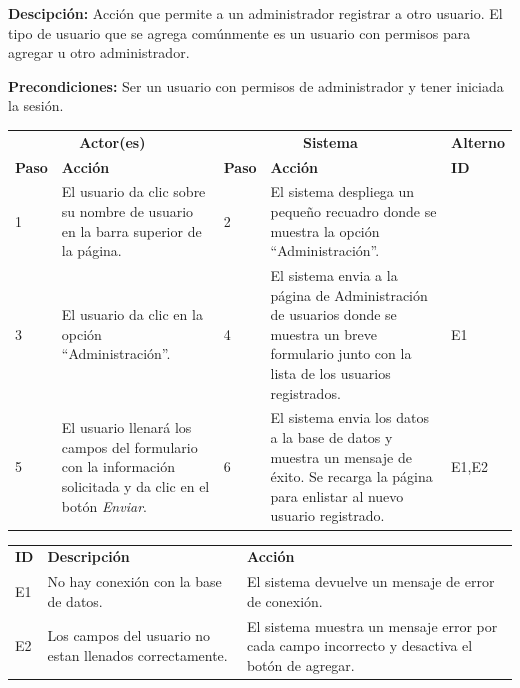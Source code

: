 \documentclass[10pt,letterpaper]{article}
\begin{document}
\textbf{Descipción: } Acción que permite a un administrador registrar a otro usuario. El tipo de usuario que se agrega comúnmente es un usuario con permisos para agregar u otro administrador.

\textbf{Precondiciones:} Ser un usuario con permisos de administrador y tener iniciada la sesión.

\begin{adjustwidth}{-6em}{-6em}
	\begin{center}
		\begin{tabularx}{1.2\textwidth}{ | p{0.7cm} | X | p{0.7cm} | X | p{1.5cm} | }
			\hline
			\rowcolor{NewBlue} \multicolumn{5}{|c|}{\textbf{Flujo normal de eventos}} \\
			\hline
			\multicolumn{2}{|c|}{\textbf{Actor(es)}}	&	\multicolumn{2}{c|}{\textbf{Sistema}}	&	\textbf{Alterno} \\
			\hline
			\textbf{Paso}	&	\textbf{Acción}	&	\textbf{Paso}	&	\textbf{Acción}	&	\textbf{ID} \\
			\hline
			1 & 
			El usuario da clic sobre su nombre de usuario en la barra superior de la página.&
			2 &
			El sistema despliega un pequeño recuadro donde se muestra la opción ``Administración''. &
			
			\\
			\hline
			3 & 
			El usuario da clic en la opción ``Administración''.&
			4 &
			El sistema envia a la página de Administración de usuarios donde se muestra un breve formulario junto con la lista de los usuarios registrados.&
			E1
			\\
			\hline
			5 & 
			El usuario llenará los campos del formulario con la información solicitada y da clic en el botón \textit{Enviar}.&
			6 &
			El sistema envia los datos a la base de datos y muestra un mensaje de éxito. Se recarga la página para enlistar al nuevo usuario registrado.&
			E1,E2
			\\
			\hline
		\end{tabularx}
	\end{center}
\end{adjustwidth}

\begin{adjustwidth}{-6em}{-6em}
	\begin{center}
		\begin{tabularx}{1.2\textwidth}{ | p{0.6cm} | X | X | }
			\hline
			\rowcolor{NewBlue} \multicolumn{3}{|c|}{\textbf{Flujo excepcional de eventos}} \\
			\hline
			\textbf{ID}	&	\textbf{Descripción}	&	\textbf{Acción} \\
			\hline
			E1 &
			No hay conexión con la base de datos. &
			El sistema devuelve un mensaje de error de conexión. \\
			\hline
			E2 &
			Los campos del usuario no estan llenados correctamente. &
			El sistema muestra un mensaje error por cada campo incorrecto y desactiva el botón de agregar. \\
			\hline
		\end{tabularx}
	\end{center}
\end{adjustwidth}
\end{document}
